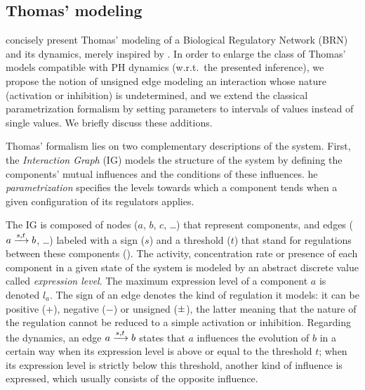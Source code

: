 \subsection{Thomas' modeling}
\label{ssec:thomas}



 concisely present Thomas' modeling of a Biological Regulatory Network (BRN) and its dynamics, merely inspired by
\cite{Richard06,BernotSemBRN}.
In order to enlarge the class of Thomas' models compatible with PH dynamics (w.r.t.~the presented
inference),
we propose the notion of unsigned edge modeling an interaction whose nature (activation or inhibition) is undetermined,
and we extend the classical parametrization formalism by setting parameters to intervals of values instead of single values.
We briefly discuss these additions.

\medskip

Thomas' formalism lies on two complementary descriptions of the system. First, the
\emph{Interaction Graph} (IG) models the structure of the system by defining the components'
mutual influences and the conditions of these influences. he \emph{parametrization}  specifies the levels towards which a component tends when a given configuration of its regulators applies.

The IG is composed of nodes ($a$, $b$, $c$, …) that represent components,
and edges ($a \xrightarrow{s, t} b$, …) labeled with a sign ($s$) and a threshold ($t$) that stand for regulations between these components ().
The activity, concentration rate or presence of each component in a given state of the system is modeled by an abstract discrete value called \emph{expression level}.
The maximum expression level of a component $a$ is denoted $l_a$.
The sign of an edge denotes the kind of regulation it models: it can be positive ($+$), negative ($-$) or unsigned ($\pm$),
the latter meaning that the nature of the regulation cannot be reduced to a simple activation or inhibition.
Regarding the dynamics, an edge $a \xrightarrow{s, t} b$ states that $a$ influences the evolution of $b$ in a certain way when its expression level is above or equal to the threshold $t$;
when its expression level is strictly below this threshold, another kind of influence is expressed, which usually consists of the opposite influence.

